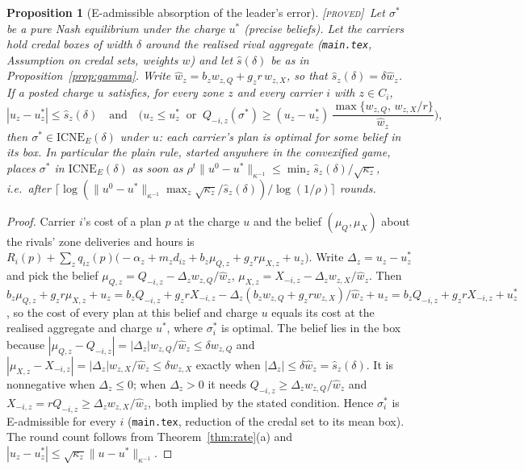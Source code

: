 \documentclass[11pt]{article}
\newtheorem{proposition}[theorem]{Proposition}
\theoremstyle{definition}
\theoremstyle{remark}
\newcommand{\ICNE}{\mathrm{ICNE}}
\newcommand{\norm}[2]{\|#1\|_{#2}}
\newcommand{\PROVED}{{\normalfont\textsc{[proved]}}}
\begin{document}
\begin{proposition}[E-admissible absorption of the leader's error]\label{prop:eadm}\PROVED\
Let $\sigma^*$ be a pure Nash equilibrium under the charge $u^*$ (precise beliefs). Let the carriers hold credal boxes of width $\delta$ around the realised rival aggregate (\texttt{main.tex}, Assumption on credal sets, weights $w$) and let $\hat s(\delta)$ be as in Proposition~\ref{prop:gamma}. Write $\hat w_z=b_zw_{z,Q}+g_zr\,w_{z,X}$, so that $\hat s_z(\delta)=\delta\hat w_z$. If a posted charge $u$ satisfies, for every zone $z$ and every carrier $i$ with $z\in C_i$,
\[|u_z-u^*_z|\le\hat s_z(\delta)\quad\text{and}\quad\Big(u_z\le u^*_z\ \text{ or }\ Q_{-i,z}(\sigma^*)\ge(u_z-u^*_z)\,\frac{\max\{w_{z,Q},\,w_{z,X}/r\}}{\hat w_z}\Big),\]
then $\sigma^*\in\ICNE_E(\delta)$ under $u$: each carrier's plan is optimal for some belief in its box. In particular the plain rule, started anywhere in the convexified game, places $\sigma^*$ in $\ICNE_E(\delta)$ as soon as $\rho^t\norm{u^0-u^*}{\kappa^{-1}}\le\min_z\hat s_z(\delta)/\sqrt{\kappa_z}$, i.e.\ after $\lceil\log(\norm{u^0-u^*}{\kappa^{-1}}\max_z\sqrt{\kappa_z}/\hat s_z(\delta))/\log(1/\rho)\rceil$ rounds.
\end{proposition}
\begin{proof}
Carrier $i$'s cost of a plan $p$ at the charge $u$ and the belief $(\mu_Q,\mu_X)$ about the rivals' zone deliveries and hours is $R_i(p)+\sum_zq_{iz}(p)\big(-\alpha_z+m_zd_{iz}+b_z\mu_{Q,z}+g_zr\mu_{X,z}+u_z\big)$. Write $\Delta_z=u_z-u^*_z$ and pick the belief $\mu_{Q,z}=Q_{-i,z}-\Delta_z w_{z,Q}/\hat w_z$, $\mu_{X,z}=X_{-i,z}-\Delta_z w_{z,X}/\hat w_z$. Then $b_z\mu_{Q,z}+g_zr\mu_{X,z}+u_z=b_zQ_{-i,z}+g_zrX_{-i,z}-\Delta_z(b_zw_{z,Q}+g_zrw_{z,X})/\hat w_z+u_z=b_zQ_{-i,z}+g_zrX_{-i,z}+u^*_z$, so the cost of every plan at this belief and charge $u$ equals its cost at the realised aggregate and charge $u^*$, where $\sigma^*_i$ is optimal. The belief lies in the box because $|\mu_{Q,z}-Q_{-i,z}|=|\Delta_z|w_{z,Q}/\hat w_z\le\delta w_{z,Q}$ and $|\mu_{X,z}-X_{-i,z}|=|\Delta_z|w_{z,X}/\hat w_z\le\delta w_{z,X}$ exactly when $|\Delta_z|\le\delta\hat w_z=\hat s_z(\delta)$. It is nonnegative when $\Delta_z\le0$; when $\Delta_z>0$ it needs $Q_{-i,z}\ge\Delta_zw_{z,Q}/\hat w_z$ and $X_{-i,z}=rQ_{-i,z}\ge\Delta_zw_{z,X}/\hat w_z$, both implied by the stated condition. Hence $\sigma^*_i$ is E-admissible for every $i$ (\texttt{main.tex}, reduction of the credal set to its mean box). The round count follows from Theorem~\ref{thm:rate}(a) and $|u_z-u^*_z|\le\sqrt{\kappa_z}\norm{u-u^*}{\kappa^{-1}}$.
\end{proof}
\end{document}
